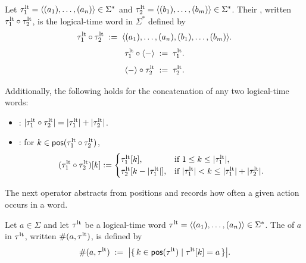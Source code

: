 %
\begin{definition}
  Let $\tau^{\mathrm{lt}}_1=\langle (a_1),\dots,(a_{n}) \rangle \in\Sigma^{*}$ and
  $\tau^{\mathrm{lt}}_2=\langle (b_1),\dots,(b_{m}) \rangle \in\Sigma^{*}$.
  Their , written $\tau^{\mathrm{lt}}_1\circ\tau^{\mathrm{lt}}_2$, is the logical-time word in $\Sigma^{*}$ defined by
  \[
    \tau^{\mathrm{lt}}_1 \circ \tau^{\mathrm{lt}}_2
    \;:=\;
    \langle (a_1),\dots,(a_{n}),(b_1),\dots,(b_{m}) \rangle .
  \]
  \[
    \tau^{\mathrm{lt}}_1 \circ \langle - \rangle 
    \;:=\;
    \tau^{\mathrm{lt}}_1.
  \]
  \[
    \langle - \rangle  \circ \tau^{\mathrm{lt}}_2
    \;:=\;
    \tau^{\mathrm{lt}}_2.
  \]
\end{definition}


Additionally, the following holds for the concatenation of any two logical-time words:
\begin{itemize}
  \item {}: $\lvert\tau^{\mathrm{lt}}_1\circ\tau^{\mathrm{lt}}_2\rvert = \lvert\tau^{\mathrm{lt}}_1\rvert + \lvert\tau^{\mathrm{lt}}_2\rvert$.
  \item {}: for $k\in\mathsf{pos}(\tau^{\mathrm{lt}}_1\circ\tau^{\mathrm{lt}}_2)$,
  \[
  (\tau^{\mathrm{lt}}_1\circ\tau^{\mathrm{lt}}_2)[k] :=
  \begin{cases}
    \tau^{\mathrm{lt}}_1[k], & \text{if } 1\le k \le \lvert\tau^{\mathrm{lt}}_1\rvert,\\
    \tau^{\mathrm{lt}}_2[k-\lvert\tau^{\mathrm{lt}}_1\rvert], & \text{if } \lvert\tau^{\mathrm{lt}}_1\rvert < k \le \lvert\tau^{\mathrm{lt}}_1\rvert+\lvert\tau^{\mathrm{lt}}_2\rvert.
  \end{cases}
  \]
\end{itemize}

The next operator abstracts from positions and records how often a given action occurs in a word.

\begin{definition}
  Let $a\in\Sigma$ and let $\tau^{\mathrm{lt}}$ be a logical-time word $\tau^{\mathrm{lt}}=\langle (a_1),\dots,(a_{n}) \rangle \in\Sigma^{*}$.
  The  of $a$ in $\tau^{\mathrm{lt}}$, written $\#(a,\tau^{\mathrm{lt}})$, is defined by
  \[
    \#(a,\tau^{\mathrm{lt}})
    \;:=\;
    \big|\{\, k\in\mathsf{pos}(\tau^{\mathrm{lt}}) \mid \tau^{\mathrm{lt}}[k]=a \,\}\big|.
  \]
\end{definition}




